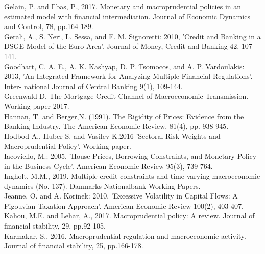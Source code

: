 \documentclass[12pt]{article}
\numberwithin{equation}{section}
\begin{document}
Gelain, P. and Ilbas, P., 2017. Monetary and macroprudential policies in an estimated model with financial intermediation. Journal of Economic Dynamics and Control, 78, pp.164-189.\\

Gerali, A., S. Neri, L. Sessa, and F. M. Signoretti: 2010, 'Credit and Banking in
a DSGE Model of the Euro Area'. Journal of Money, Credit and Banking 42,
107-141.\\

Goodhart, C. A. E., A. K. Kashyap, D. P. Tsomocos, and A. P. Vardoulakis: 2013,
'An Integrated Framework for Analyzing Multiple Financial Regulations'. Inter-
national Journal of Central Banking 9(1), 109-144.\\

Greenwald D. The Mortgage Credit Channel of
Macroeconomic Transmission. Working paper 2017. \\

Hannan, T. and Berger,N. (1991). The Rigidity of Prices: Evidence from the
Banking Industry. The American Economic Review, 81(4), pp. 938-945. \\

Hodbod A.,  Huber S. and Vasilev K.2016 'Sectoral Risk Weights and Macroprudential Policy'. Working paper.\\
 
Iacoviello, M.: 2005, 'House Prices, Borrowing Constraints, and Monetary Policy in
the Business Cycle'. American Economic Review 95(3), 739-764.\\

Ingholt, M.M., 2019. Multiple credit constraints and time-varying macroeconomic dynamics (No. 137). Danmarks Nationalbank Working Papers.\\



Jeanne, O. and A. Korinek: 2010, 'Excessive Volatility in Capital Flows: A Pigouvian
Taxation Approach'. American Economic Review 100(2), 403-407.\\

Kahou, M.E. and Lehar, A., 2017. Macroprudential policy: A review. Journal of financial stability, 29, pp.92-105.\\

Karmakar, S., 2016. Macroprudential regulation and macroeconomic activity. Journal of financial stability, 25, pp.166-178.\\
\end{document}
